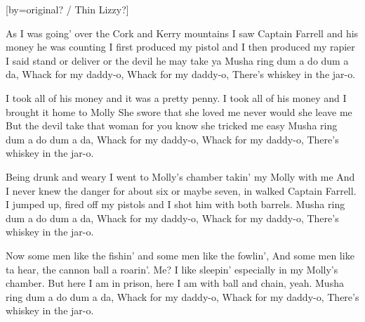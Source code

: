

[by=original? / Thin Lizzy?]

\begin{LARGE}


\beginverse
As I was going' over the Cork and Kerry mountains
I saw Captain Farrell and his money he was counting
I first produced my pistol and I then produced my rapier
I said stand or deliver or the devil he may take ya
Musha ring dum a do dum a da, Whack for my daddy-o,
Whack for my daddy-o, There's whiskey in the jar-o.
\endverse

\beginverse
I took all of his money and it was a pretty penny.
I took all of his money and I brought it home to Molly
She swore that she loved me never would she leave me
But the devil take that woman for you know she tricked me easy
Musha ring dum a do dum a da, Whack for my daddy-o,
Whack for my daddy-o, There's whiskey in the jar-o.
\endverse

\beginverse
Being drunk and weary I went to Molly's chamber takin' my Molly with me
And I never knew the danger for about six or maybe seven, in walked Captain Farrell.
I jumped up, fired off my pistols and I shot him with both barrels.
Musha ring dum a do dum a da, Whack for my daddy-o,
Whack for my daddy-o, There's whiskey in the jar-o.
\endverse

\beginverse
Now some men like the fishin' and some men like the fowlin',
And some men like ta hear, the cannon ball a roarin'.
Me? I like sleepin' especially in my Molly's chamber.
But here I am in prison, here I am with ball and chain, yeah.
Musha ring dum a do dum a da, Whack for my daddy-o,
Whack for my daddy-o, There's whiskey in the jar-o.
\endverse




\end{LARGE}


\chordson
\endsong
